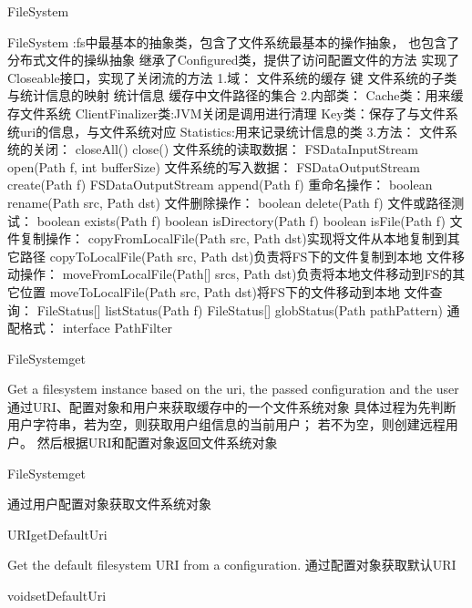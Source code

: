 \begin{XeClass}{FileSystem}

FileSystem :fs中最基本的抽象类，包含了文件系统最基本的操作抽象，
也包含了分布式文件的操纵抽象
继承了Configured类，提供了访问配置文件的方法
实现了Closeable接口，实现了关闭流的方法
1.域：
文件系统的缓存
键
文件系统的子类与统计信息的映射
统计信息
缓存中文件路径的集合
2.内部类：
Cache类：用来缓存文件系统
ClientFinalizer类:JVM关闭是调用进行清理
Key类：保存了与文件系统uri的信息，与文件系统对应
Statistics:用来记录统计信息的类
3.方法：
文件系统的关闭：
closeAll()
close()
文件系统的读取数据：
FSDataInputStream open(Path f, int bufferSize)
文件系统的写入数据：
FSDataOutputStream create(Path f)
FSDataOutputStream append(Path f)
重命名操作：
boolean rename(Path src, Path dst)
文件删除操作：
boolean delete(Path f)
文件或路径测试：
boolean exists(Path f)
boolean isDirectory(Path f)
boolean isFile(Path f)
文件复制操作：
copyFromLocalFile(Path src, Path dst)实现将文件从本地复制到其它路径
copyToLocalFile(Path src, Path dst)负责将FS下的文件复制到本地
文件移动操作：
moveFromLocalFile(Path[] srcs, Path dst)负责将本地文件移动到FS的其它位置
moveToLocalFile(Path src, Path dst)将FS下的文件移动到本地
文件查询：
FileStatus[] listStatus(Path f)
FileStatus[] globStatus(Path pathPattern)
通配格式：
interface PathFilter

    \begin{XeMethod}{\XePublic}{FileSystem}{get}

Get a filesystem instance based on the uri, the passed
configuration and the user
通过URI、配置对象和用户来获取缓存中的一个文件系统对象
具体过程为先判断用户字符串，若为空，则获取用户组信息的当前用户；
若不为空，则创建远程用户。
然后根据URI和配置对象返回文件系统对象

    \end{XeMethod}

    \begin{XeMethod}{\XePublic}{FileSystem}{get}

通过用户配置对象获取文件系统对象

    \end{XeMethod}

    \begin{XeMethod}{\XePublic}{URI}{getDefaultUri}

Get the default filesystem URI from a configuration.
通过配置对象获取默认URI

    \end{XeMethod}

    \begin{XeMethod}{\XePublic}{void}{setDefaultUri}


\end{XeMethod}
\end{XeClass}
